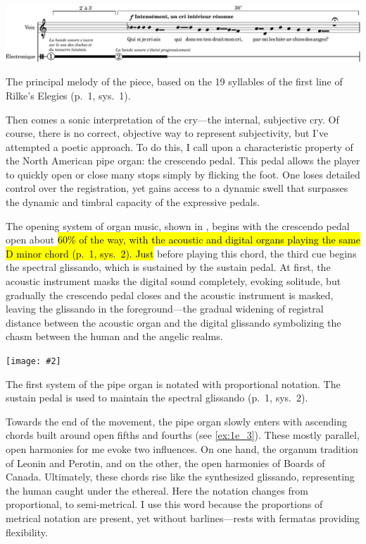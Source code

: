 \documentclass[12pt,twoside,maitrise]{dms_ks}
\newcommand{\customincludeexamples}[4][]{%
    \begin{example}[H]
        \centering
        \texttt{[image: \#2]}
        \caption{#4}
	\label{#3} 
    \end{example}
}
\theoremstyle{definition}
\begin{document}
{{%

\begin{example}[H]
    \centering
    \includegraphics[width=\textwidth]{1e_1}
    \caption{The principal melody of the piece, based on the 19 syllables of the first line of Rilke's Elegies (p.~1, sys.~1)\protect\footnotemark.}
    \label{ex:1e_1}
\end{example}


Then comes a sonic interpretation of the cry---the internal, subjective cry.
Of course, there is no correct, objective way to represent subjectivity, but I've attempted a poetic approach.
To do this, I call upon a characteristic property of the North American pipe organ: the crescendo pedal.
This pedal allows the player to quickly open or close many stops simply by flicking the foot.
One loses detailed control over the registration, yet gains access to a dynamic swell that surpasses the dynamic and timbral capacity of the expressive pedals.

The opening system of organ music, shown in , begins with the crescendo pedal open about \hl{60\% of the way, with the acoustic and digital organs playing the same D minor chord (p.~1, sys.~2).
Just} before playing this chord, the third cue begins the spectral glissando, which is sustained by the sustain pedal.
At first, the acoustic instrument masks the digital sound completely, evoking solitude, but gradually the crescendo pedal closes and the acoustic instrument is masked, leaving the glissando in the foreground---the gradual widening of registral distance between the acoustic organ and the digital glissando symbolizing the chasm between the human and the angelic realms.

\customincludeexamples[width=\textwidth]{1e_2}{ex:1e_2}{The first system of the pipe organ is notated with proportional notation. The sustain pedal is used to maintain the spectral glissando (p.~1, sys.~2).}

Towards the end of the movement, the pipe organ slowly enters with ascending chords built around open fifths and fourths (see \cref{ex:1e_3}).
These mostly parallel, open harmonies for me evoke two influences.
On one hand, the organum tradition of Leonin and Perotin, and on the other, the open harmonies of Boards of Canada.
Ultimately, these chords rise like the synthesized glissando, representing the human caught under the ethereal.
Here the notation changes from proportional, to semi-metrical.
I use this word because the proportions of metrical notation are present, yet without barlines---rests with fermatas providing flexibility.

}}
\end{document}
